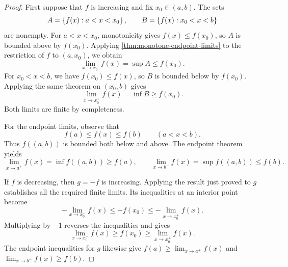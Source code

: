 \documentclass[11pt,a4paper]{amsart}
\begin{document}
\begin{proof}
  First suppose that \(f\) is increasing and fix \(x_0\in(a,b)\).
  The sets
  \[
    A=\left\lbrace f(x):a<x<x_0\right\rbrace,\qquad
    B=\left\lbrace f(x):x_0<x<b\right\rbrace
  \]
  are nonempty. For \(a<x<x_0\), monotonicity gives
  \(f(x)\leq f(x_0)\), so \(A\) is bounded above by \(f(x_0)\).
  Applying \cref{thm:monotone-endpoint-limits} to the restriction
  of \(f\) to \((a,x_0)\), we obtain
  \[
    \lim_{x\to x_0^-}f(x)=\sup A\leq f(x_0).
  \]
  For \(x_0<x<b\), we have \(f(x_0)\leq f(x)\), so \(B\) is
  bounded below by \(f(x_0)\). Applying the same theorem on
  \((x_0,b)\) gives
  \[
    \lim_{x\to x_0^+}f(x)=\inf B\geq f(x_0).
  \]
  Both limits are finite by completeness.

  For the endpoint limits, observe that
  \[
    f(a)\leq f(x)\leq f(b)\qquad(a<x<b).
  \]
  Thus \(f((a,b))\) is bounded both below and above. The endpoint
  theorem yields
  \[
    \lim_{x\to a^+}f(x)=\inf f((a,b))\geq f(a),
    \qquad
    \lim_{x\to b^-}f(x)=\sup f((a,b))\leq f(b).
  \]

  If \(f\) is decreasing, then \(g=-f\) is increasing. Applying
  the result just proved to \(g\) establishes all the required
  finite limits. Its inequalities at an interior point become
  \[
    -\lim_{x\to x_0^-}f(x)\leq-f(x_0)
    \leq-\lim_{x\to x_0^+}f(x).
  \]
  Multiplying by \(-1\) reverses the inequalities and gives
  \[
    \lim_{x\to x_0^-}f(x)\geq f(x_0)
    \geq\lim_{x\to x_0^+}f(x).
  \]
  The endpoint inequalities for \(g\) likewise give
  \(f(a)\geq\lim_{x\to a^+}f(x)\) and
  \(\lim_{x\to b^-}f(x)\geq f(b)\).
\end{proof}
\end{document}
